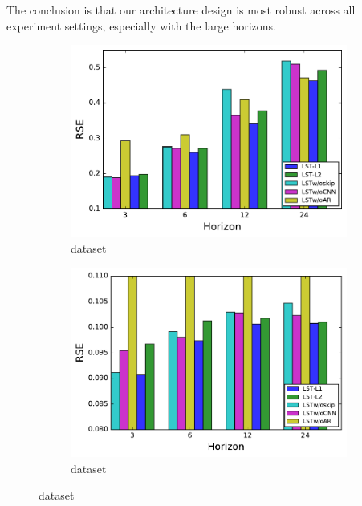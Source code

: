 The conclusion is that our architecture design is most robust across all experiment settings, especially with the large horizons.

\begin{figure}[!ht]
  \begin{subfigure}{.22\textwidth}
    \centering
    \includegraphics[width=\linewidth]{fig/rmse-solar.pdf}
    \caption{\solar dataset}
  \end{subfigure}
  \begin{subfigure}{.22\textwidth}
    \centering
    \includegraphics[width=\linewidth]{fig/rmse-ele.pdf}
    \caption{\electricity dataset}
  \end{subfigure}
  

\end{figure}
